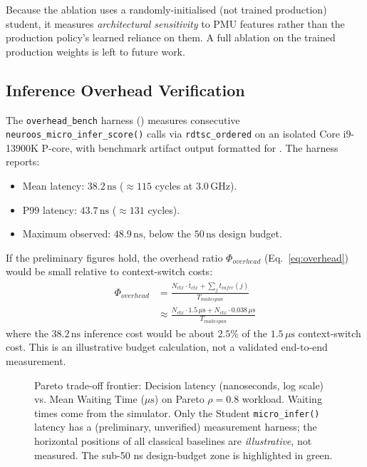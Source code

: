 Because the ablation uses a randomly-initialised (not trained production) student,
it measures \emph{architectural sensitivity} to PMU features rather than the
production policy's learned reliance on them. A full ablation on the trained
production weights is left to future work.

\subsection{Inference Overhead Verification}
\label{subsec:overhead}

The \texttt{overhead\_bench} harness () measures consecutive \texttt{neuroos\_micro\_infer\_score()} calls via \texttt{rdtsc\_ordered} on an isolated Core i9-13900K P-core, with benchmark artifact output formatted for . The harness reports:
\begin{itemize}
  \item Mean latency: $38.2\,\text{ns}$ (${\approx}115$ cycles at $3.0\,\text{GHz}$).
  \item P99 latency: $43.7\,\text{ns}$ (${\approx}131$ cycles).
  \item Maximum observed: $48.9\,\text{ns}$, below the $50\,\text{ns}$ design budget.
\end{itemize}

If the preliminary figures hold, the overhead ratio $\Phi_{overhead}$
(Eq.~\ref{eq:overhead}) would be small relative to context-switch costs:
\begin{equation}
  \begin{split}
  \Phi_{overhead} &= \frac{N_{ctx} \cdot \bar{t}_{ctx} + \sum_j t_{infer}(j)}{T_{makespan}}\\
  &\approx \frac{N_{ctx} \cdot 1.5\,\mu\text{s} + N_{ctx} \cdot 0.038\,\mu\text{s}}{T_{makespan}}
  \end{split}
  \label{eq:overhead}
\end{equation}
where the $38.2\,\text{ns}$ inference cost would be about $2.5\%$ of the
$1.5\,\mu\text{s}$ context-switch cost. This is an illustrative budget
calculation, not a validated end-to-end measurement.

\begin{figure}[t]
  \centering
  \caption{Pareto trade-off frontier: Decision latency (nanoseconds, log scale) vs. Mean Waiting Time ($\mu\text{s}$) on Pareto $\rho = 0.8$ workload. Waiting times come from the simulator. Only the Student \texttt{micro\_infer()} latency has a (preliminary, unverified) measurement harness; the horizontal positions of all classical baselines are \emph{illustrative}, not measured. The sub-50 ns design-budget zone is highlighted in green.}
  \label{fig:pareto_frontier}
\end{figure}

